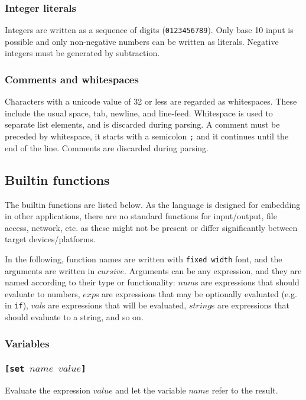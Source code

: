 \documentclass[11pt]{report}
\begin{document}
\subsubsection{Integer literals}

Integers are written as a sequence of digits (\verb|0123456789|). Only base 10 input is possible and only non-negative numbers can be written as literals. Negative integers must be generated by subtraction.

\subsubsection{Comments and whitespaces}
Characters with a unicode value of 32 or less are regarded as whitespaces. These include the usual space, tab, newline, and line-feed. Whitespace is used to separate list elements, and is discarded during parsing. A comment must be preceded by whitespace, it starts with a semicolon \verb|;| and it continues until the end of the line. Comments are discarded during parsing.

\subsection{Builtin functions}
The builtin functions are listed below. As the language is designed for embedding in other applications, there are no standard functions for input/output, file access, network, etc. as these might not be present or differ significantly between target devices/platforms.

In the following, function names are written with {\tt fixed width} font, and the arguments are written in $cursive$. Arguments can be any expression, and they are named according to their type or functionality: $num$s are expressions that should evaluate to numbers, $exp$s are expressions that may be optionally evaluated (e.g. in {\tt if}), $val$s are expressions that will be evaluated, $string$s are expressions that should evaluate to a string, and so on.

\subsubsection{Variables}
\subsubsection*{\tt{[set }$name$ $value$\tt{]}}
Evaluate the expression $value$ and let the variable $name$ refer to the result.
\end{document}
